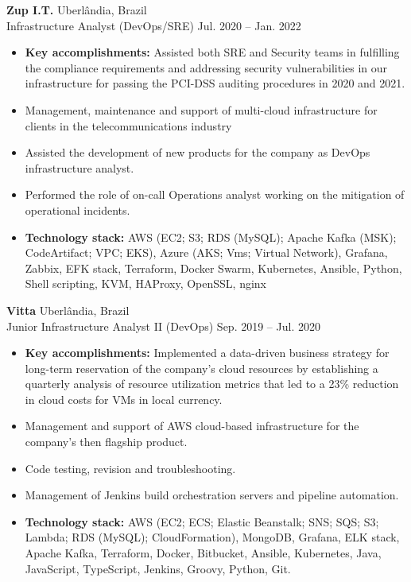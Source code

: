 \documentclass[12pt]{article}
\newcommand{\entry}[4]{{{\textbf{#1}}} \hfill #3 \\ #2 \hfill #4}
\begin{document}
\begin{paracol}{2}
\entry{Zup I.T.}{Infrastructure Analyst (DevOps/SRE)}{Uberlândia, Brazil}{Jul. 2020 -- Jan. 2022}
\begin{itemize}[noitemsep,leftmargin=3.5mm,rightmargin=0mm,topsep=6pt]
  \item \textbf{Key accomplishments:} Assisted both SRE and Security teams in fulfilling the compliance requirements and addressing security vulnerabilities in our infrastructure for passing the PCI-DSS auditing procedures in 2020 and 2021.
  \item Management, maintenance and support of multi-cloud
  infrastructure for clients in the telecommunications industry
  \item Assisted the development of new products for the company as DevOps
  infrastructure analyst.
  \item Performed the role of on-call Operations analyst working on the mitigation
  of operational incidents.
  \item \textbf{Technology stack:} AWS (EC2; S3; RDS (MySQL); Apache Kafka
  (MSK); CodeArtifact; VPC; EKS), Azure (AKS;
  Vms; Virtual Network), Grafana, Zabbix, EFK
  stack, Terraform, Docker Swarm, Kubernetes, Ansible, Python, Shell scripting,
  KVM, HAProxy, OpenSSL, nginx
\end{itemize}

\medskip

\entry{Vitta}{Junior Infrastructure Analyst II (DevOps)}{Uberlândia, Brazil}{Sep. 2019 -- Jul. 2020}
\begin{itemize}[noitemsep,leftmargin=3.5mm,rightmargin=0mm,topsep=6pt]
  \item \textbf{Key accomplishments:} Implemented a data-driven business strategy for long-term reservation of the company's cloud resources by establishing a quarterly analysis of resource utilization metrics that led to a 23\% reduction in cloud costs for VMs in local currency.
  \item Management and support of AWS cloud-based infrastructure for the company’s then flagship product.
  \item Code testing, revision and troubleshooting.
  \item Management of Jenkins build orchestration servers and pipeline automation.
  \item \textbf{Technology stack:} AWS (EC2; ECS; Elastic Beanstalk; SNS; SQS; S3;
  Lambda; RDS (MySQL); CloudFormation), MongoDB, Grafana, ELK stack, Apache Kafka,
  Terraform, Docker, Bitbucket, Ansible, Kubernetes, Java, JavaScript, TypeScript,
  Jenkins, Groovy, Python, Git.
\end{itemize}


\end{paracol}
\end{document}
